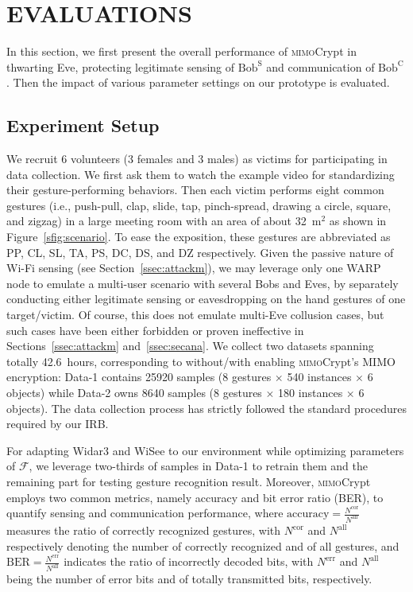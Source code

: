 \documentclass[conference,compsoc]{IEEEtran}
\newcommand{\sname}{\textsc{mimo}Crypt\xspace}
\newcommand{\newrev}[1]{{\color{blue}#1}}    %
\newcommand{\newrev}[1]{#1}
\begin{document}
\section{\MakeUppercase{Evaluations}} \label{sec:eval}
In this section, we first present the overall performance of \sname in thwarting Eve, protecting legitimate sensing of $\mathrm{Bob^S}$ and communication of $\mathrm{Bob^C}$. Then the impact of various parameter settings on our prototype is evaluated.


\subsection{Experiment Setup} \label{ssec:expsetup}
%
We recruit 6 volunteers (3 females and 3 males) as victims for participating in data collection. We first ask them to watch the example video for standardizing their gesture-performing behaviors. Then each victim performs eight common gestures (i.e., push-pull, clap, slide, tap, pinch-spread, drawing a circle, square, and zigzag) in a large meeting room with an area of about 32~\!m$^2$ as shown in Figure~\ref{sfig:scenario}. To ease the exposition, these gestures are abbreviated as PP, CL, SL, TA, PS, DC, DS, and DZ respectively. \newrev{Given the passive nature of Wi-Fi sensing (see Section~\ref{ssec:attackm}), we may leverage only one WARP node to emulate a multi-user scenario with several Bobs and Eves, by separately conducting either 
legitimate sensing or eavesdropping on the hand gestures of one target/victim. Of course, this does not emulate multi-Eve collusion cases, but such cases have been either forbidden or proven ineffective in Sections~\ref{ssec:attackm} and~\ref{ssec:secana}.}
%
We collect two datasets spanning totally 42.6~\!hours, corresponding to without/with enabling \sname's MIMO encryption: \textsf{Data-1} contains 25920 samples (8 gestures $\times$ 540 instances $\times$ 6 objects) while \textsf{Data-2} owns 8640 samples (8 gestures $\times$ 180 instances $\times$ 6 objects). The data collection process has strictly followed the standard procedures required by our IRB.

For adapting Widar3 and WiSee to our environment while optimizing parameters of $\mathcal{F}$, we leverage two-thirds of samples in \textsf{Data-1} to retrain them and the remaining part for testing gesture recognition result. Moreover, \sname employs two common metrics, namely accuracy and bit error ratio (BER), to quantify sensing and communication performance, where $\mathrm{accuracy} = \frac{N^{\mathrm{cor}}}{N^{\mathrm{all}}}$  measures the ratio of correctly recognized gestures, with $N^{\mathrm{cor}}$ and $N^{\mathrm{all}}$ respectively denoting the number of correctly recognized and of all gestures, and $\mathrm{BER} = \frac{N^{\mathrm{err}}}{N^{\mathrm{all}}}$ indicates the ratio of incorrectly decoded bits, with $N^{\mathrm{err}}$ and $N^{\mathrm{all}}$ being the number of error bits and of totally transmitted bits, respectively.   
\end{document}
